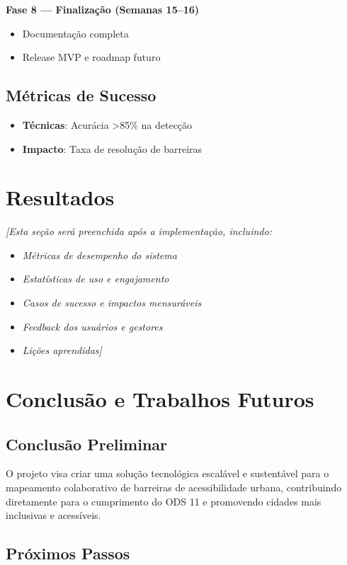 \documentclass[12pt,a4paper]{article}
\begin{document}
\textbf{Fase 8 — Finalização (Semanas 15–16)}
\begin{itemize}
    \item Documentação completa
    \item Release MVP e roadmap futuro
\end{itemize}

\subsection{Métricas de Sucesso}
\begin{itemize}
    \item \textbf{Técnicas}: Acurácia >85\% na detecção
    \item \textbf{Impacto}: Taxa de resolução de barreiras
\end{itemize}

\section{Resultados}
\label{sec:resultados}

\textit{[Esta seção será preenchida após a implementação, incluindo:}
\begin{itemize}
    \item \textit{Métricas de desempenho do sistema}
    \item \textit{Estatísticas de uso e engajamento}
    \item \textit{Casos de sucesso e impactos mensuráveis}
    \item \textit{Feedback dos usuários e gestores}
    \item \textit{Lições aprendidas]}
\end{itemize}

\section{Conclusão e Trabalhos Futuros}
\label{sec:conclusao}

\subsection{Conclusão Preliminar}

O projeto visa criar uma solução tecnológica escalável e sustentável para o mapeamento colaborativo de barreiras de acessibilidade urbana, contribuindo diretamente para o cumprimento do ODS 11 e promovendo cidades mais inclusivas e acessíveis.

\subsection{Próximos Passos}
\end{document}
